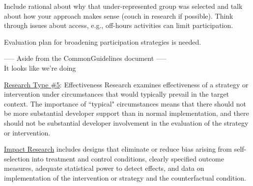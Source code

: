 \documentclass[12pt]{article}
\begin{document}
\vspace{1em}
\noindent Include rational about why that under-represented group was selected and talk
about how your approach makes sense (couch in research if possible). Think
through issues about access, e.g., off-hours activities can limit participation.

\vspace{1em}
\noindent Evaluation plan for broadening participation strategies is needed.

\vspace{2em}
\noindent ----- Aside from the CommonGuidelines document -----\\
It looks like we're doing

\underline{Research Type \#5}: Effectiveness Research examines effectiveness of a strategy or intervention under circumstances that would typically prevail in the target context. The importance of ``typical" circumstances means that there should not be more substantial 
developer support than in normal implementation, and there should not be substantial developer involvement in the evaluation of the strategy or intervention.

\underline{Impact Research} includes designs that eliminate or reduce bias arising from self-selection into treatment and control 
conditions, clearly specified outcome measures, adequate statistical power to detect effects, and data on implementation of the intervention or strategy and the counterfactual condition.
\end{document}
